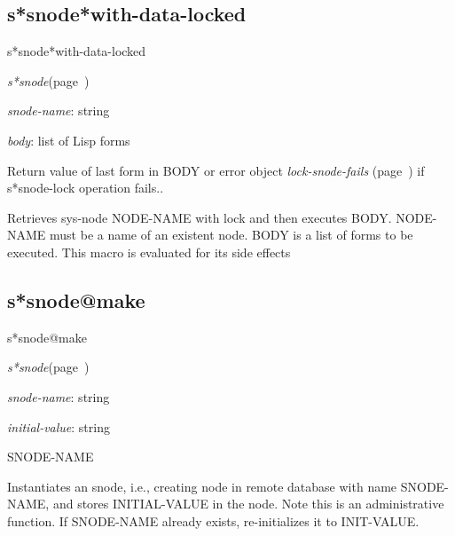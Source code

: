 \subsection{s*snode*with-data-locked}
\label{s*snode*with-data-locked}

\begin{description}
\item [Name:]  s*snode*with-data-locked

\item [Class:]
{\sl s*snode}\hfill(page~\pageref{s*snode})

\item [Parameters:]
\item {\sl snode-name}:  string

\item {\sl body}:  list of Lisp forms


\item [Return-value:]
Return value of last form in BODY or error object
{\sl lock-snode-fails} (page~\pageref{lock-snode-fails}) if s*snode-lock operation fails..

\item [Description:]
Retrieves sys-node NODE-NAME with lock and then
executes BODY.  NODE-NAME must be a name of an
existent node.  BODY is a list of forms to be
executed.  This macro is evaluated for its side
effects

\item [Public:]



\end{description}
\horizontalline

\subsection{s*snode@make}
\label{s*snode@make}

\begin{description}
\item [Name:]  s*snode@make

\item [Class:]
{\sl s*snode}\hfill(page~\pageref{s*snode})

\item [Parameters:]
\item {\sl snode-name}:  string

\item {\sl initial-value}:  string


\item [Return-value:] SNODE-NAME

\item [Description:]
Instantiates an snode, i.e., creating node in remote
database with name SNODE-NAME, and stores INITIAL-VALUE
in the node. Note this is an administrative function. If
SNODE-NAME already exists, re-initializes it to
INIT-VALUE.

\item [Public:]



\end{description}
\horizontalline

